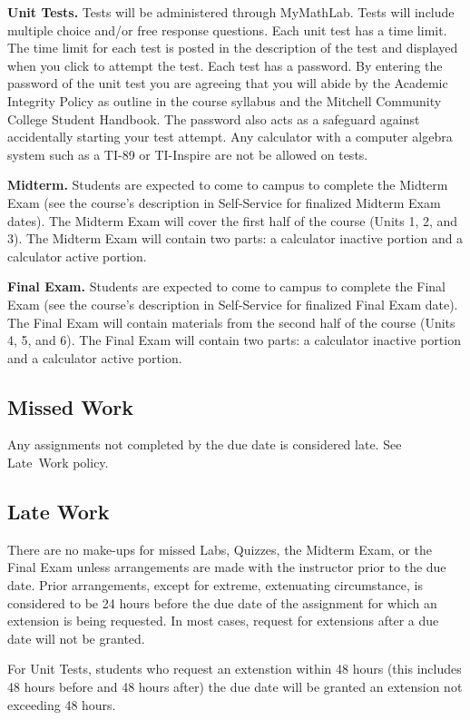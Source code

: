 \documentclass{article}
\begin{document}
\textbf{Unit Tests.} Tests will be administered through MyMathLab. Tests will include multiple choice and/or free response questions. Each unit test has a time limit. The time limit for each test is posted in the description of the test and displayed when you click to attempt the test. Each test has a password. By entering the password of the unit test you are agreeing that you will abide by the Academic Integrity Policy as outline in the course syllabus and the Mitchell Community College Student Handbook. The password also acts as a safeguard against accidentally starting your test attempt. Any calculator with a computer algebra system such as a TI-89 or TI-Inspire are not be allowed on tests.

\textbf{Midterm.} Students are expected to come to campus to complete the Midterm Exam (see the course's description in Self-Service for finalized Midterm Exam dates). The Midterm Exam will cover the first half of the course (Units 1, 2, and 3). The Midterm Exam will contain two parts: a calculator inactive portion and a calculator active portion.

\textbf{Final Exam.} Students are expected to come to campus to complete the Final Exam (see the course's description in Self-Service for finalized Final Exam date). The Final Exam will contain materials from the second half of the course (Units 4, 5, and 6). The Final Exam will contain two parts: a calculator inactive portion and a calculator active portion.

\subsection{Missed Work}

Any assignments not completed by the due date is considered late. See Late~Work policy.

\subsection{Late Work}

There are no make-ups for missed Labs, Quizzes, the Midterm Exam, or the Final Exam unless arrangements are made with the instructor prior to the due date. Prior arrangements, except for extreme, extenuating circumstance, is considered to be 24 hours before the due date of the assignment for which an extension is being requested. In most cases, request for extensions after a due date will not be granted.

For Unit Tests, students who request an extenstion within 48 hours (this includes 48 hours before and 48 hours after) the due date will be granted an extension not exceeding 48 hours.
\end{document}
